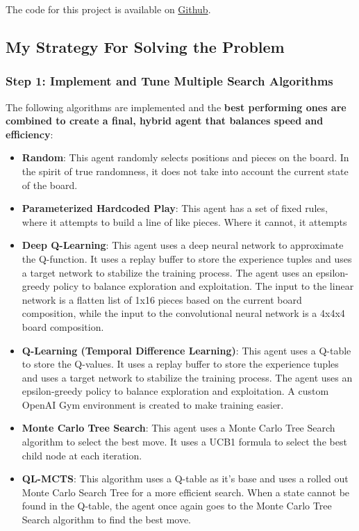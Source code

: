 The code for this project is available on \href{https://github.com/sidharrth2002/ci-quarto-sidharrth}{Github}.

\subsection{My Strategy For Solving the Problem}

\subsubsection{Step 1: Implement and Tune Multiple Search Algorithms}

The following algorithms are implemented and the \textbf{best performing ones are combined to create a final, hybrid agent that balances speed and efficiency}:

\begin{itemize}
    \item \textbf{Random}: This agent randomly selects positions and pieces on the board. In the spirit of true randomness, it does not take into account the current state of the board.
    \item \textbf{Parameterized Hardcoded Play}: This agent has a set of fixed rules, where it attempts to build a line of like pieces. Where it cannot, it attempts
    \item \textbf{Deep Q-Learning}: This agent uses a deep neural network to approximate the Q-function. It uses a replay buffer to store the experience tuples and uses a target network to stabilize the training process. The agent uses an epsilon-greedy policy to balance exploration and exploitation. The input to the linear network is a flatten list of 1x16 pieces based on the current board composition, while the input to the convolutional neural network is a 4x4x4 board composition.
    \item \textbf{Q-Learning (Temporal Difference Learning)}: This agent uses a Q-table to store the Q-values. It uses a replay buffer to store the experience tuples and uses a target network to stabilize the training process. The agent uses an epsilon-greedy policy to balance exploration and exploitation. A custom OpenAI Gym environment is created to make training easier.
    \item \textbf{Monte Carlo Tree Search}: This agent uses a Monte Carlo Tree Search algorithm to select the best move. It uses a UCB1 formula to select the best child node at each iteration.
    \item \textbf{QL-MCTS}: This algorithm uses a Q-table as it's base and uses a rolled out Monte Carlo Search Tree for a more efficient search. When a state cannot be found in the Q-table, the agent once again goes to the Monte Carlo Tree Search algorithm to find the best move.
\end{itemize}

